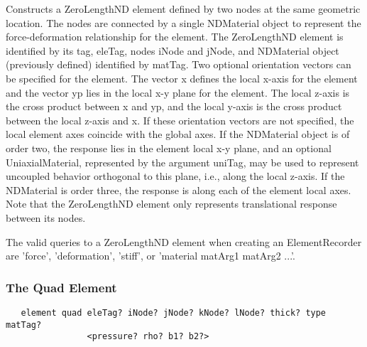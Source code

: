 \documentclass[12pt]{article}
\begin{document}
\noindent Constructs a ZeroLengthND element defined by two nodes at the
same geometric location. The nodes are connected by a single
NDMaterial object to represent the force-deformation
relationship for the element.
The ZeroLengthND element is identified
by its tag, eleTag, nodes iNode and jNode, and NDMaterial object
(previously defined) identified by matTag. Two optional orientation vectors can be
specified for the element. The vector x defines the local x-axis for
the element and the vector yp lies in the local x-y plane for the
element. The local z-axis is the cross product between x and yp, and
the local y-axis is the cross product between the local z-axis and x.
If these orientation vectors are not specified, the local element axes
coincide with the global axes.
If the NDMaterial object is of order two, the response lies in the
element local x-y plane, and an optional UniaxialMaterial, represented
by the argument uniTag, may be used
to represent uncoupled behavior orthogonal to this plane, i.e., along the local
z-axis. If the NDMaterial is order three, the response is along
each of the element local axes. Note that the ZeroLengthND element
only represents translational response between its nodes.


The valid queries to a ZeroLengthND element when creating an ElementRecorder
are 'force', 'deformation', 'stiff', or 'material matArg1 matArg2 ...'.




\subsubsection{The Quad Element}
{\sf\small
\begin{verbatim}
   element quad eleTag? iNode? jNode? kNode? lNode? thick? type matTag? 
                <pressure? rho? b1? b2?>
\end{verbatim}
}
\end{document}
